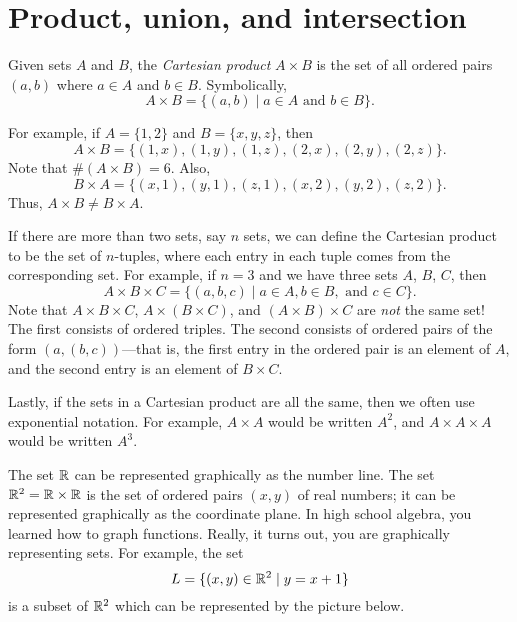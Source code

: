 \documentclass{tufte-book}
\begin{document}


\section{Product, union, and intersection}
\label{sec:prod-union-inters}

\begin{definition}
  Given sets $A$ and $B$, the \emph{Cartesian product} $A \times B$ is the set of all ordered pairs $(a, b)$ where $a \in A$ and $b \in B$. Symbolically,
  \[
  A \times B = \{(a,b) \mid a \in A \text{ and } b \in B\}.
  \]
\end{definition}
For example, if $A = \{1, 2\}$ and $B = \{x, y, z\}$, then
\[
A \times B = \{(1, x), (1, y), (1, z), (2, x), (2, y), (2, z)\}.
\]
Note that $\#(A \times B) = 6$. Also,
\[
B \times A = \{(x, 1), (y, 1), (z, 1), (x, 2), (y, 2), (z, 2)\}.
\]
Thus, $A \times B \neq B \times A$.

If there are more than two sets, say $n$ sets, we can define the Cartesian product to be the set of $n$-tuples, where each entry in each tuple comes from the corresponding set. For example, if $n = 3$ and we have three sets $A$, $B$, $C$, then
\[
A \times B \times C = \{(a, b, c) \mid a \in A, b \in B, \text{ and } c \in C\}.
\]
Note that $A \times B \times C$, $A \times (B \times C)$, and $(A \times B) \times C$ are \emph{not} the same set! The first consists of ordered triples. The second consists of ordered pairs of the form $(a, (b, c))$---that is, the first entry in the ordered pair is an element of $A$, and the second entry is an element of $B \times C$.

Lastly, if the sets in a Cartesian product are all the same, then we often use exponential notation. For example, $A \times A$ would be written $A^2$, and $A \times A \times A$ would be written $A^3$.

\begin{example}
  The set $\mathbb{R}$ can be represented graphically as the number line. The set $\mathbb{R}^2 = \mathbb{R} \times \mathbb{R}$ is the set of ordered pairs $(x, y)$ of real numbers; it can be represented graphically as the coordinate plane. In high school algebra, you learned how to graph functions. Really, it turns out, you are graphically representing sets. For example, the set
  \[
  L = \{(x,y) \in \mathbb{R}^2 \mid y = x + 1\}
  \]
  is a subset of $\mathbb{R}^2$ which can be represented by the picture below.
    \begin{center}
  \end{center}

\end{example}
\end{document}

